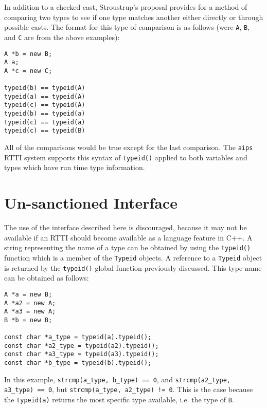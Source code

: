 In addition to a checked cast, Stroustrup's proposal provides for a method
of comparing two types to see if one type matches another either directly or
through possible casts. The format for this type of comparison is as follows
(were {\tt A}, {\tt B}, and {\tt C} are from the above examples):
\begin{verbatim}
A *b = new B;
A a;
A *c = new C;

typeid(b) == typeid(A)
typeid(a) == typeid(A)
typeid(c) == typeid(A)
typeid(b) == typeid(a)
typeid(c) == typeid(a)
typeid(c) == typeid(B)
\end{verbatim}
\noindent
All of the comparisons would be true except for the last comparison. The
{\tt aips} RTTI system supports this syntax of {\tt typeid()} applied to 
both variables and types which have run time type information.

\section{Un-sanctioned Interface}

The use of the interface described here is discouraged, because it may not
be available if an RTTI should become available as a language feature in C++.
A string representing the name of a type can be obtained by using the 
{\tt typeid()} function which is a member of the {\tt Typeid} objects. A 
reference to a {\tt Typeid} object is returned by the {\tt typeid()} global
function previously discussed. This type name can be obtained as follows:
\begin{verbatim}
A *a = new B;
A *a2 = new A;
A *a3 = new A;
B *b = new B;

const char *a_type = typeid(a).typeid();
const char *a2_type = typeid(a2).typeid();
const char *a3_type = typeid(a3).typeid();
const char *b_type = typeid(b).typeid();
\end{verbatim}
\noindent
In this example, {\tt strcmp(a\_type, b\_type) == 0}, and 
{\tt strcmp(a2\_type, a3\_type) == 0}, but {\tt strcmp(a\_type, a2\_type) != 0}.
This is the case because the {\tt typeid(a)} returns the most specific type 
available, i.e. the type of {\tt B}.

